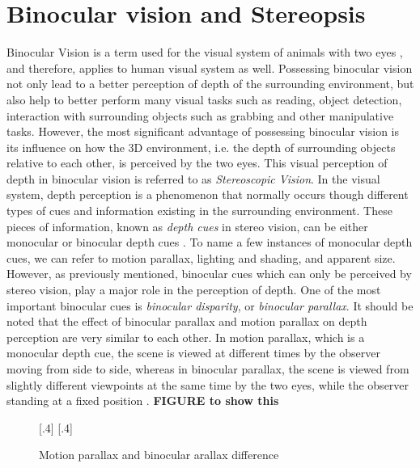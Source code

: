 \chapter{Binocular vision and Stereopsis}
\label{chap:BinocularVision}

Binocular Vision is a term used for the visual system of animals with two eyes \cite{how95}, and therefore, applies to human visual system as well. 
Possessing binocular vision not only lead to a better perception of depth
of the surrounding environment, but also help to better perform many visual tasks such as reading, object detection, interaction with surrounding objects such as grabbing and other manipulative 
tasks. However, the most significant advantage of possessing binocular vision is its influence on how the 3D environment, i.e. the depth of surrounding objects relative to each other, 
is perceived by the two eyes. This visual perception of depth in binocular vision is referred to as {\it Stereoscopic Vision}.
In the visual system, depth perception is a phenomenon that normally occurs though different types of cues and information existing in the surrounding environment. 
These pieces of information, known as {\it depth cues} in stereo vision, can be either monocular or binocular depth cues \cite{how95}.
To name a few instances of monocular depth cues, we can refer to motion parallax, lighting and shading, and apparent size. 
However, as previously mentioned, binocular cues which can only be perceived
by stereo vision, play a major role in the perception of depth. One of the most important binocular cues is {\it binocular disparity}, or {\it binocular parallax}. 
It should be noted that the effect of binocular parallax and motion parallax on depth perception are very similar to each other. 
In motion parallax, which is a monocular depth cue, the scene is viewed at different times by the observer moving from side to side, 
whereas in binocular parallax, the scene is viewed from slightly different viewpoints at
the same time by the two eyes, while the observer standing at a fixed position \cite{how95}. \textbf{FIGURE to show this}

\begin{figure}[!h]
\centering
{}
[.4\linewidth]{}%
[.4\linewidth]{}%
\caption{Motion parallax and binocular arallax difference}
\label{fig:parallax}
\end{figure}

%
%

